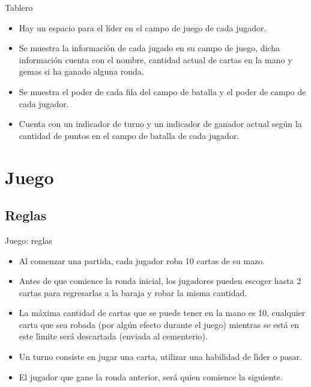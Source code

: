 \documentclass[a4paper, 12pt]{beamer}
\begin{document}
\begin{frame}{\textcolor{plata}{Tablero}}
\begin{itemize}
\item Hay un espacio para el líder en el campo de juego de cada jugador.
\item Se muestra la información de cada jugado en su campo de juego, dicha información cuenta con el nombre, cantidad actual de cartas en la mano y gemas si ha ganado alguna ronda.
\item Se muestra el poder de cada fila del campo de batalla y el poder de campo de cada jugador.
\item Cuenta con un indicador de turno y un indicador de ganador actual según la cantidad de puntos en el campo de batalla de cada jugador.
\end{itemize}
\end{frame}

\section{Juego}

\subsection{Reglas}
\begin{frame}{\textcolor{plata}{Juego: reglas}}
\begin{itemize}
\item Al comenzar una partida, cada jugador roba 10 cartas de su mazo.
\item Antes de que comience la ronda inicial, los jugadores pueden escoger hasta 2 cartas para regresarlas a la baraja y robar la misma cantidad.
\item La máxima cantidad de cartas que se puede tener en la mano es 10, cualquier carta que sea robada (por algún efecto durante el juego) mientras se está en este lı́mite será descartada (enviada al cementerio).
\item Un turno consiste en jugar una carta, utilizar una habilidad de lı́der o
pasar.
\item El jugador que gane la ronda anterior, será quien comience la siguiente.
\end{itemize}
\end{frame}
\end{document}
